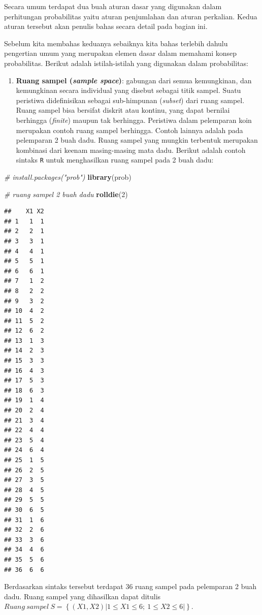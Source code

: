 \documentclass[]{book}
\newenvironment{Shaded}{\begin{snugshade}}{\end{snugshade}}
\newcommand{\KeywordTok}[1]{\textcolor[rgb]{0.13,0.29,0.53}{\textbf{#1}}}
\newcommand{\DecValTok}[1]{\textcolor[rgb]{0.00,0.00,0.81}{#1}}
\newcommand{\CommentTok}[1]{\textcolor[rgb]{0.56,0.35,0.01}{\textit{#1}}}
\newcommand{\NormalTok}[1]{#1}
\providecommand{\tightlist}{%
  \setlength{\itemsep}{0pt}\setlength{\parskip}{0pt}}
\begin{document}
Secara umum terdapat dua buah aturan dasar yang digunakan dalam
perhitungan probabilitas yaitu aturan penjumlahan dan aturan perkalian.
Kedua aturan tersebut akan penulis bahas secara detail pada bagian ini.

Sebelum kita membahas keduanya sebaiknya kita bahas terlebih dahulu
pengertian umum yang merupakan elemen dasar dalam memahami konsep
probabilitas. Berikut adalah istilah-istilah yang digunakan dalam
probabilitas:

\begin{enumerate}
\def\labelenumi{\arabic{enumi}.}
\tightlist
\item
  \textbf{Ruang sampel (\emph{sample space})}: gabungan dari semua
  kemungkinan, dan kemungkinan secara individual yang disebut sebagai
  titik sampel. Suatu peristiwa didefinisikan sebagai sub-himpunan
  (\emph{subset}) dari ruang sampel. Ruang sampel bisa bersifat diskrit
  atau kontinu, yang dapat bernilai berhingga (\emph{finite}) maupun tak
  berhingga. Peristiwa dalam pelemparan koin merupakan contoh ruang
  sampel berhingga. Contoh lainnya adalah pada pelemparan 2 buah dadu.
  Ruang sampel yang mungkin terbentuk merupakan kombinasi dari keenam
  masing-masing mata dadu. Berikut adalah contoh sintaks \texttt{R}
  untuk menghasilkan ruang sampel pada 2 buah dadu:
\end{enumerate}

\begin{Shaded}
\begin{Highlighting}[]
\CommentTok{# install.packages("prob")}
\KeywordTok{library}\NormalTok{(prob)}

\CommentTok{# ruang sampel 2 buah dadu}
\KeywordTok{rolldie}\NormalTok{(}\DecValTok{2}\NormalTok{)}
\end{Highlighting}
\end{Shaded}

\begin{verbatim}
##    X1 X2
## 1   1  1
## 2   2  1
## 3   3  1
## 4   4  1
## 5   5  1
## 6   6  1
## 7   1  2
## 8   2  2
## 9   3  2
## 10  4  2
## 11  5  2
## 12  6  2
## 13  1  3
## 14  2  3
## 15  3  3
## 16  4  3
## 17  5  3
## 18  6  3
## 19  1  4
## 20  2  4
## 21  3  4
## 22  4  4
## 23  5  4
## 24  6  4
## 25  1  5
## 26  2  5
## 27  3  5
## 28  4  5
## 29  5  5
## 30  6  5
## 31  1  6
## 32  2  6
## 33  3  6
## 34  4  6
## 35  5  6
## 36  6  6
\end{verbatim}

Berdasarkan sintaks tersebut terdapat 36 ruang sampel pada pelemparan 2
buah dadu. Ruang sampel yang dihasilkan dapat ditulis
\(Ruang\ sampel\ S=\left\{\left(X1,X2\right)\left|1\le X1\le6;\ 1\le X2\le6\right|\right\}\).
\end{document}
